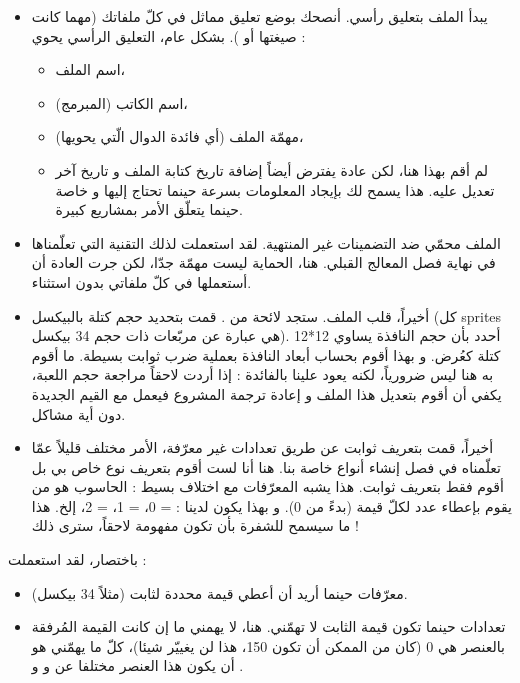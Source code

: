 \begin{itemize}
	\item يبدأ الملف بتعليق رأسي. أنصحك بوضع تعليق مماثل في كلّ ملفاتك (مهما كانت صيغتها
	أو
	).
	بشكل عام، التعليق الرأسي يحوي :
	\begin{itemize}
		\item اسم الملف،
		\item اسم الكاتب (المبرمج)،
		\item مهمّة الملف (أي فائدة الدوال الّتي يحويها)،
		\item لم أقم بهذا هنا، لكن عادة يفترض أيضاً إضافة تاريخ كتابة الملف و تاريخ آخر تعديل عليه. هذا يسمح لك بإيجاد المعلومات بسرعة حينما تحتاج إليها و خاصة حينما يتعلّق الأمر بمشاريع كبيرة.
	\end{itemize}
	\item الملف محمّي ضد التضمينات غير المنتهية. لقد استعملت لذلك التقنية التي تعلّمناها في نهاية فصل المعالج القبلي. هنا، الحماية ليست مهمّة جدّا، لكن جرت العادة أن أستعملها في كلّ ملفاتي
	بدون استثناء.
	\item أخيراً، قلب الملف. ستجد لائحة من 
	.
	قمت بتحديد حجم كتلة بالبيكسل (كل
	\textenglish{sprites}
	هي عبارة عن مربّعات ذات حجم 34 بيكسل). أحدد بأن حجم النافذة يساوي 12*12 كتلة كعُرض. و بهذا أقوم بحساب أبعاد النافذة بعملية ضرب ثوابت بسيطة. ما أقوم به هنا ليس ضرورياً، لكنه يعود علينا بالفائدة : إذا أردت لاحقاً مراجعة حجم اللعبة، يكفي أن أقوم بتعديل هذا الملف و إعادة ترجمة المشروع فيعمل مع القيم الجديدة دون أية مشاكل.
	\item أخيراً، قمت بتعريف ثوابت عن طريق تعدادات غير معرّفة، الأمر مختلف قليلاً عمّا تعلّمناه في فصل إنشاء أنواع خاصة بنا. هنا أنا لست أقوم بتعريف نوع خاص بي بل أقوم فقط بتعريف ثوابت. هذا يشبه المعرّفات مع اختلاف بسيط : الحاسوب هو من يقوم بإعطاء عدد لكلّ قيمة (بدءً من 0). و بهذا يكون لدينا : 
	 = 0،
	 = 1،
	 = 2،
	إلخ. هذا ما سيسمح للشفرة بأن تكون مفهومة لاحقاً، سترى ذلك !
\end{itemize}

باختصار، لقد استعملت :

\begin{itemize}
	\item معرّفات حينما أريد أن أعطي قيمة محددة لثابت (مثلاً 34 بيكسل).
	\item تعدادات حينما تكون قيمة الثابت لا تهمّني. هنا، لا يهمني ما إن كانت القيمة المُرفقة بالعنصر
	هي 0 (كان من الممكن أن تكون 150، هذا لن يغييّر شيئا)، كلّ ما يهمّني هو أن يكون هذا العنصر مختلفا عن
	و
	و
	.
\end{itemize}

